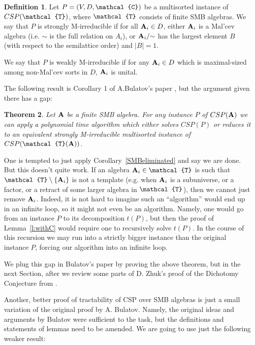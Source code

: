\documentclass[11pt]{amsart}
\newcommand{\m}[1]{{\uppercase {\mathbf {#1}}}}
\newcommand{\vr}[1]{{\uppercase {\mathcal{#1}}}}
\newtheorem{thm}{Theorem}[section]
\theoremstyle{definition}
\newtheorem{df}[thm]{Definition}
\begin{document}
\begin{df}\label{defM-irred}
Let $P=(V,D,\vr c)$ be a multisorted instance of $CSP(\vr t)$, where $\vr t$ consists of finite SMB algebras. We say that $P$ is strongly M-irreducible if for all $\m a_i\in D$, either $\m a_i$ is a Mal'cev algebra (i.e. ${\sim}$ is the full relation on $A_i$), or $\m a_i/{\sim}$ has the largest element $B$ (with respect to the semilattice order) and $|B|=1$.

We say that $P$ is weakly M-irreducible if for any $\m a_i\in D$ which is maximal-sized among non-Mal'cev sorts in $D$, $\m a_i$ is unital.
\end{df}

The following result is Corollary 1 of A.Bulatov's paper \cite{BuSMB}, but the argument given there has a gap:

\begin{thm}\label{M-irrdesired}
Let $\m a$ be a finite SMB algebra. For any instance $P$ of $CSP(\m a)$ we can apply a polynomial time algorithm which either solves $CSP(P)$ or reduces it to an equivalent strongly M-irreducible multisorted instance of $CSP(\vr t(\m a))$.
\end{thm}

One is tempted to just apply Corollary~\ref{SMBeliminated} and say we are done. But this doesn't quite work. If an algebra $\m a_i\in\vr t$ is such that $\vr t\setminus\{\m a_i\}$ is not a template (e.g. when $\m a_i$ is a subuniverse, or a factor, or a retract of some larger algebra in $\vr t$), then we cannot just remove $\m a_i$. Indeed, it is not hard to imagine such an ``algorithm'' would end up in an infinite loop, so it might not even be an algorithm. Namely, one would go from an instance $P$ to its decomposition $t(P)$, but then the proof of Lemma~\ref{l:withC} would require one to recursively solve $t(P)$. In the course of this recursion we may run into a strictly bigger instance than the original instance $P$, forcing our algorithm into an infinite loop.

We plug this gap in Bulatov's paper by proving the above theorem, but in the next Section, after we review some parts of D. Zhuk's proof of the Dichotomy Conjecture from \cite{Zhdich}.

Another, better proof of tractability of CSP over SMB algebras is just a small variation of the original proof by A. Bulatov. Namely, the original ideas and arguments by Bulatov were sufficient to the task, but the definitions and statements of lemmas need to be amended. We are going to use just the following weaker result:
\end{document}
